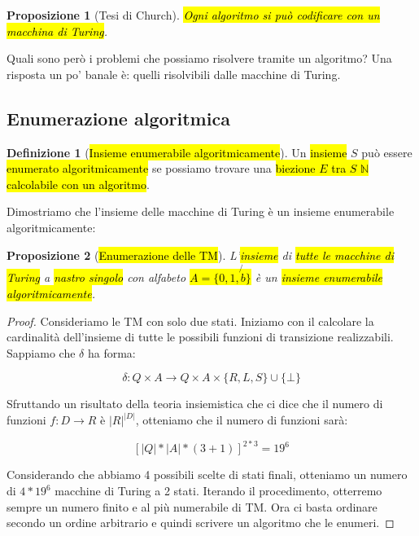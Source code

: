 \documentclass[a4paper,11pt,oneside]{article}
\theoremstyle{plain}
\newtheorem{prop}{Proposizione}[section]
\theoremstyle{definition}
\newtheorem{defn}{Definizione}[section]
\theoremstyle{remark}
\begin{document}
\begin{prop}[Tesi di Church]\label{thm:tesi-church-2}
  \hl{Ogni algoritmo si può codificare con un macchina di Turing}.
\end{prop}

Quali sono però i problemi che possiamo risolvere tramite un algoritmo? Una
risposta un po' banale è: quelli risolvibili dalle macchine di Turing.

\subsection{Enumerazione algoritmica}\label{sec:enum-alg}

\begin{defn}[\hl{Insieme enumerabile algoritmicamente}]\label{def:enum-alg}
  Un \hl{insieme} $S$ può essere \hl{enumerato algoritmicamente} se possiamo
  trovare una \hl{biezione $E$ tra $S$ $\mathbb{N}$ calcolabile con un
  algoritmo}.
\end{defn}

Dimostriamo che l'insieme delle macchine di Turing è un insieme enumerabile
algoritmicamente:

\begin{prop}[\hl{Enumerazione delle TM}]\label{thm:enum-alg-TM}
  L'\hl{insieme} di \hl{tutte le macchine di Turing} a \hl{nastro singolo} con
  alfabeto \hl{$A = \{ 0,1,\not{b}\}$} è un \hl{insieme enumerabile
  algoritmicamente}.
\end{prop}
\begin{proof}
  Consideriamo le TM con solo due stati. Iniziamo con il calcolare la
  cardinalità dell'insieme di tutte le possibili funzioni di transizione
  realizzabili. Sappiamo che $\delta$ ha forma:

  \[
    \delta : Q \times A \to Q \times A \times \{R,L,S\} \cup \{\bot\}
  \]

  Sfruttando un risultato della teoria insiemistica che ci dice che il numero di
  funzioni $f: D \to R$ è $|R|^{|D|}$, otteniamo che il numero di funzioni sarà:

  \[
    {[|Q|*|A|*(3+1)]}^{2*3} = 19^6
  \]

  Considerando che abbiamo 4 possibili scelte di stati finali, otteniamo un
  numero di $4*19^6$ macchine di Turing a 2 stati. Iterando il procedimento,
  otterremo sempre un numero finito e al più numerabile di TM\@. Ora ci basta
  ordinare secondo un ordine arbitrario e quindi scrivere un algoritmo che le
  enumeri.
\end{proof}
\end{document}
